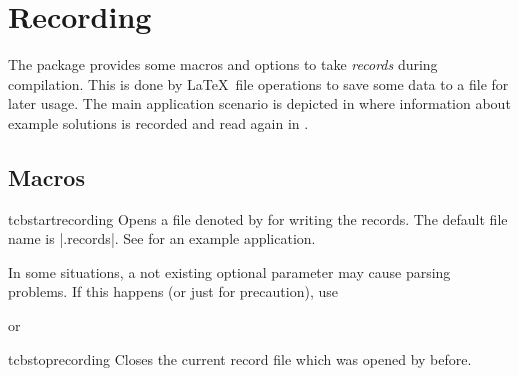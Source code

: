 \clearpage
\section{Recording}\label{sec:recording}%
%
The package provides some macros and options to take \emph{records} during
compilation. This is done by \LaTeX\ file operations to save some data
to a file for later usage. The main application scenario is depicted in
 where
information about example solutions is recorded and read again
in .

\subsection{Macros}\label{sec:recording-makros}
\begin{docCommand}[doc new=2014-11-28]{tcbstartrecording}{}
  Opens a file denoted by  for writing the records.
  The default file name is |\jobname.records|.
  See  for an example application.
  \begin{marker}
  In some situations, a not existing optional parameter may cause parsing
  problems. If this happens (or just for precaution), use
\begin{dispListing}
\tcbstartrecording\relax
\end{dispListing}
  or
\begin{dispListing}
\end{dispListing}
  \end{marker}
\end{docCommand}


\begin{docCommand}[doc new=2014-11-28]{tcbstoprecording}{}
  Closes the current record file which was opened by 
  before.
\end{docCommand}

